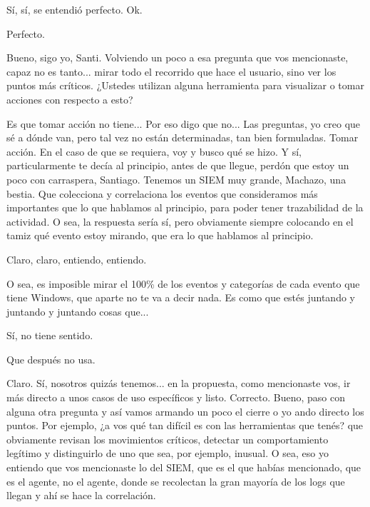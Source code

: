 \begin{description}[leftmargin=0cm, labelsep=0.5cm]
    \item[\textbf{MOCIULSKY SANTIAGO:}] Sí, sí, se entendió perfecto. Ok.

    \item[\textbf{PITA GUILLERMO:}] Perfecto.

    \item[\textbf{MUNTAABSKI FEDERICO:}] Bueno, sigo yo, Santi. Volviendo un poco a esa pregunta que vos mencionaste, capaz no es tanto... mirar todo el recorrido que hace el usuario, sino ver los puntos más críticos. ¿Ustedes utilizan alguna herramienta para visualizar o tomar acciones con respecto a esto?

    \item[\textbf{PITA GUILLERMO:}] Es que tomar acción no tiene... Por eso digo que no... Las preguntas, yo creo que sé a dónde van, pero tal vez no están determinadas, tan bien formuladas. Tomar acción. En el caso de que se requiera, voy y busco qué se hizo. Y sí, particularmente te decía al principio, antes de que llegue, perdón que estoy un poco con carraspera, Santiago. Tenemos un SIEM muy grande, Machazo, una bestia. Que colecciona y correlaciona los eventos que consideramos más importantes que lo que hablamos al principio, para poder tener trazabilidad de la actividad. O sea, la respuesta sería sí, pero obviamente siempre colocando en el tamiz qué evento estoy mirando, que era lo que hablamos al principio.

    \item[\textbf{MUNTAABSKI FEDERICO:}] Claro, claro, entiendo, entiendo.

    \item[\textbf{PITA GUILLERMO:}] O sea, es imposible mirar el 100\% de los eventos y categorías de cada evento que tiene Windows, que aparte no te va a decir nada. Es como que estés juntando y juntando y juntando cosas que...

    \item[\textbf{MUNTAABSKI FEDERICO:}] Sí, no tiene sentido.

    \item[\textbf{PITA GUILLERMO:}] Que después no usa.

    \item[\textbf{MUNTAABSKI FEDERICO:}] Claro. Sí, nosotros quizás tenemos... en la propuesta, como mencionaste vos, ir más directo a unos casos de uso específicos y listo. Correcto. Bueno, paso con alguna otra pregunta y así vamos armando un poco el cierre o yo ando directo los puntos. Por ejemplo, ¿a vos qué tan difícil es con las herramientas que tenés? que obviamente revisan los movimientos críticos, detectar un comportamiento legítimo y distinguirlo de uno que sea, por ejemplo, inusual. O sea, eso yo entiendo que vos mencionaste lo del SIEM, que es el que habías mencionado, que es el agente, no el agente, donde se recolectan la gran mayoría de los logs que llegan y ahí se hace la correlación.


\end{description}
